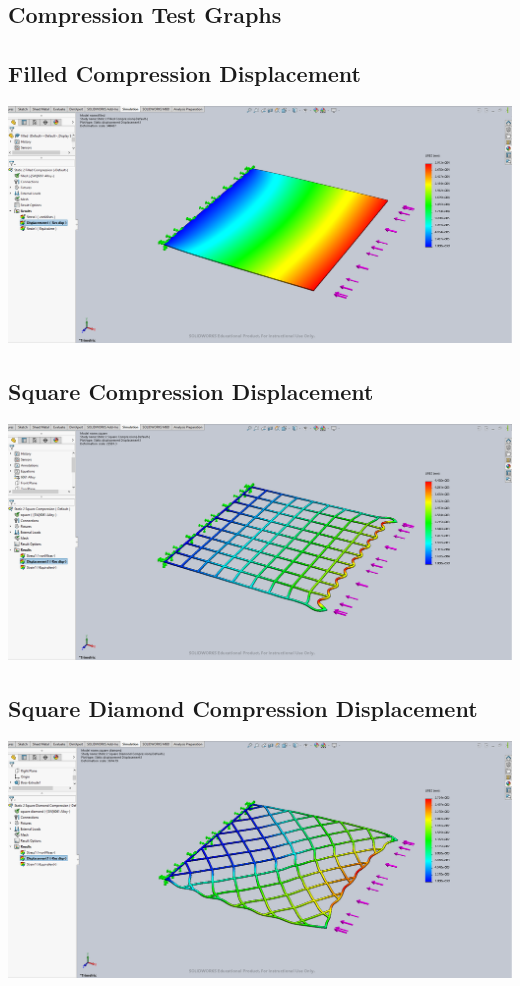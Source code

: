 \documentclass[12pt, letterpaper]{article}
\begin{document}
\begin{singlespace}
\section{Compression Test Graphs}
\label{ap:c}

\subsection{Filled Compression Displacement}
\label{ap:f-c-d}
\includegraphics[width=0.8\linewidth]{./graphs/compression/filled-compression-displacement}

\subsection{Square Compression Displacement}
\label{ap:s-c-d}
\includegraphics[width=0.8\linewidth]{./graphs/compression/square-compression-displacement}

\subsection{Square Diamond Compression Displacement}
\label{ap:sd-c-d}
\includegraphics[width=0.8\linewidth]{./graphs/compression/square-diamond-compression-displacement}


\end{singlespace}
\end{document}
